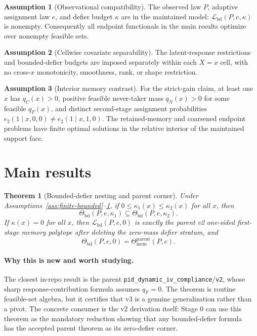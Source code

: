 \documentclass[11pt]{article}
\theoremstyle{definition}
\newtheorem{assumption}{Assumption}
\theoremstyle{plain}
\newtheorem{theorem}{Theorem}
\theoremstyle{remark}
\begin{document}
\begin{assumption}[Observational compatibility]\label{ass:compatible}
The observed law \(P\), adaptive assignment law \(e\), and defier budget \(\kappa\) are in the maintained model: \(\mathcal{L}_{\mathrm{bd}}(P,e,\kappa)\) is nonempty.  Consequently all endpoint functionals in the main results optimize over nonempty feasible sets.
\end{assumption}

\begin{assumption}[Cellwise covariate separability]\label{ass:cellwise}
The latent-response restrictions and bounded-defier budgets are imposed separately within each \(X=x\) cell, with no cross-\(x\) monotonicity, smoothness, rank, or shape restriction.
\end{assumption}

\begin{assumption}[Interior memory contrast]\label{ass:interior-memory}
For the strict-gain claim, at least one \(x\) has \(q_C(x)>0\), positive feasible never-taker mass \(q_N(x)>0\) for some feasible \(q_F(x)\), and distinct second-stage assignment probabilities \(e_2(1\mid x,0,0)\ne e_2(1\mid x,1,0)\).  The retained-memory and coarsened endpoint problems have finite optimal solutions in the relative interior of the maintained support face.
\end{assumption}

\section{Main results}
\begin{theorem}[Bounded-defier nesting and parent corner]\label{thm:corner-nesting}
Under Assumptions~\ref{ass:finite-bounded}--\ref{ass:compatible}, if \(0\le\kappa_1(x)\le\kappa_2(x)\) for all \(x\), then
\[
\Theta_{\mathrm{bd}}(P,e,\kappa_1)\subseteq \Theta_{\mathrm{bd}}(P,e,\kappa_2).
\]
If \(\kappa(x)=0\) for all \(x\), then \(\mathcal{L}_{\mathrm{bd}}(P,e,0)\) is exactly the parent v2 one-sided first-stage memory polytope after deleting the zero-mass defier stratum, and
\[
\Theta_{\mathrm{bd}}(P,e,0)=\Theta_{\mathrm{mem}}^{\mathrm{parent}}(P,e).
\]
\end{theorem}
\paragraph{Why this is new and worth studying.}
The closest in-repo result is the parent \texttt{pid\_dynamic\_iv\_compliance}/\texttt{v2}, whose sharp response-contribution formula assumes \(q_F=0\).  The theorem is routine feasible-set algebra, but it certifies that v3 is a genuine generalization rather than a pivot.  The concrete consumer is the v2 derivation itself: Stage 0 can use this theorem as the mandatory reduction showing that any bounded-defier formula has the accepted parent theorem as its zero-defier corner.
\end{document}
